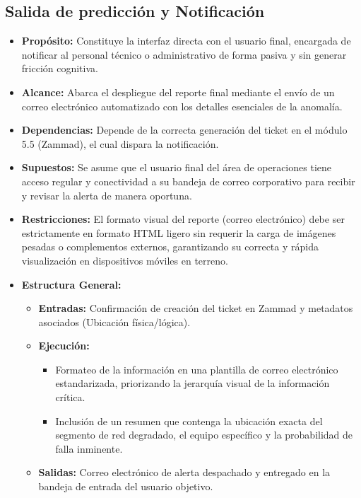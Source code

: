 \documentclass[12pt,a4paper]{article}
\begin{document}
    \subsection{Salida de predicción y Notificación}
    \begin{itemize}
        \item \textbf{Propósito:} Constituye la interfaz directa con el usuario final, encargada de notificar al personal técnico o administrativo de forma pasiva y sin generar fricción cognitiva.

        \item \textbf{Alcance:} Abarca el despliegue del reporte final mediante el envío de un correo electrónico automatizado con los detalles esenciales de la anomalía.
        \item \textbf{Dependencias:} Depende de la correcta generación del ticket en el módulo 5.5 (Zammad), el cual dispara la notificación.
        \item \textbf{Supuestos:} Se asume que el usuario final del área de operaciones tiene acceso regular y conectividad a su bandeja de correo corporativo para recibir y revisar la alerta de manera oportuna.
        \item \textbf{Restricciones:} El formato visual del reporte (correo electrónico) debe ser estrictamente en formato HTML ligero sin requerir la carga de imágenes pesadas o complementos externos, garantizando su correcta y rápida visualización en dispositivos móviles en terreno.
        \item \textbf{Estructura General:} 
        \begin{itemize}
            \item \textbf{Entradas:} Confirmación de creación del ticket en Zammad y metadatos asociados (Ubicación física/lógica).
            \item \textbf{Ejecución:}
            \begin{itemize}
                \item Formateo de la información en una plantilla de correo electrónico estandarizada, priorizando la jerarquía visual de la información crítica.
                \item Inclusión de un resumen que contenga la ubicación exacta del segmento de red degradado, el equipo específico y la probabilidad de falla inminente.
            \end{itemize}
            \item \textbf{Salidas:} Correo electrónico de alerta despachado y entregado en la bandeja de entrada del usuario objetivo.
        \end{itemize}
    \end{itemize}
                
\end{document}
